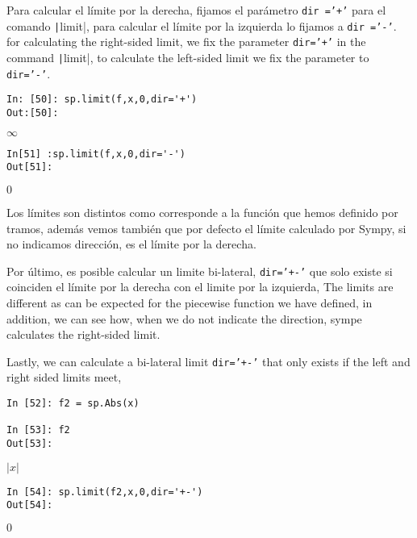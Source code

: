 \begin{paracol}{2}
Para calcular el límite por la derecha, fijamos el parámetro \texttt{dir ='+'} para el comando \texttt|limit|, para calcular el límite por la izquierda lo fijamos a \texttt{dir ='-'}.
\switchcolumn
for calculating the right-sided limit, we fix the parameter \texttt{dir='+'} in the command \texttt|limit|, to calculate the left-sided limit we fix the parameter to \texttt{dir='-'}.
\end{paracol}
\begin{center}
	\begin{minipage}{.6\textwidth}
		\begin{verbatim}
In: [50]: sp.limit(f,x,0,dir='+')
Out:[50]: 
		\end{verbatim}
		$\infty$
		\begin{verbatim}
In[51] :sp.limit(f,x,0,dir='-')
Out[51]: 
\end{verbatim}
$0$
\end{minipage}
\end{center}
\begin{paracol}{2}
Los límites son distintos como corresponde a la función que hemos definido por tramos, además vemos también que por defecto el límite calculado por Sympy, si no indicamos dirección, es el límite por la derecha.

Por último, es posible calcular un limite bi-lateral, \texttt{dir='+-'} que solo existe si coinciden el límite por la derecha con el limite por la izquierda,
\switchcolumn
The limits are different as can be expected for the piecewise function we have defined, in addition, we can see how, when we do not indicate the direction, sympe calculates the right-sided limit.

Lastly, we can calculate a bi-lateral limit \texttt{dir='+-'} that only exists if the left and right sided limits meet,
\end{paracol}
\begin{center}
	\begin{minipage}{.6\textwidth}
		\begin{verbatim}
In [52]: f2 = sp.Abs(x)

In [53]: f2
Out[53]: 		\end{verbatim}
		$|x|$
		\begin{verbatim}
In [54]: sp.limit(f2,x,0,dir='+-')
Out[54]: 
		\end{verbatim}
		$0$
		
	\end{minipage}
\end{center}

